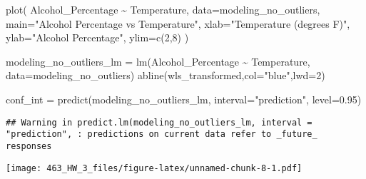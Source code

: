 \documentclass[
]{article}
\newenvironment{Shaded}{\begin{snugshade}}{\end{snugshade}}
\newcommand{\AttributeTok}[1]{\textcolor[rgb]{0.77,0.63,0.00}{#1}}
\newcommand{\DecValTok}[1]{\textcolor[rgb]{0.00,0.00,0.81}{#1}}
\newcommand{\FloatTok}[1]{\textcolor[rgb]{0.00,0.00,0.81}{#1}}
\newcommand{\FunctionTok}[1]{\textcolor[rgb]{0.00,0.00,0.00}{#1}}
\newcommand{\NormalTok}[1]{#1}
\newcommand{\OtherTok}[1]{\textcolor[rgb]{0.56,0.35,0.01}{#1}}
\newcommand{\SpecialCharTok}[1]{\textcolor[rgb]{0.00,0.00,0.00}{#1}}
\newcommand{\StringTok}[1]{\textcolor[rgb]{0.31,0.60,0.02}{#1}}
\begin{document}
\begin{Shaded}
\begin{Highlighting}[]
\FunctionTok{plot}\NormalTok{(}
\NormalTok{  Alcohol\_Percentage }\SpecialCharTok{\textasciitilde{}}\NormalTok{ Temperature, }\AttributeTok{data=}\NormalTok{modeling\_no\_outliers,}
  \AttributeTok{main=}\StringTok{"Alcohol Percentage vs Temperature"}\NormalTok{,}
  \AttributeTok{xlab=}\StringTok{"Temperature (degrees F)"}\NormalTok{,}
  \AttributeTok{ylab=}\StringTok{"Alcohol Percentage"}\NormalTok{,}
  \AttributeTok{ylim=}\FunctionTok{c}\NormalTok{(}\DecValTok{2}\NormalTok{,}\DecValTok{8}\NormalTok{)}
\NormalTok{)}

\NormalTok{modeling\_no\_outliers\_lm }\OtherTok{=} \FunctionTok{lm}\NormalTok{(Alcohol\_Percentage }\SpecialCharTok{\textasciitilde{}}\NormalTok{ Temperature, }\AttributeTok{data=}\NormalTok{modeling\_no\_outliers)}
\FunctionTok{abline}\NormalTok{(wls\_transformed,}\AttributeTok{col=}\StringTok{"blue"}\NormalTok{,}\AttributeTok{lwd=}\DecValTok{2}\NormalTok{)}

\NormalTok{conf\_int }\OtherTok{=} \FunctionTok{predict}\NormalTok{(modeling\_no\_outliers\_lm, }\AttributeTok{interval=}\StringTok{"prediction"}\NormalTok{, }\AttributeTok{level=}\FloatTok{0.95}\NormalTok{)}
\end{Highlighting}
\end{Shaded}

\begin{verbatim}
## Warning in predict.lm(modeling_no_outliers_lm, interval = "prediction", : predictions on current data refer to _future_ responses
\end{verbatim}

\begin{Shaded}
\end{Shaded}

\texttt{[image: 463\_HW\_3\_files/figure-latex/unnamed-chunk-8-1.pdf]}
\end{document}
